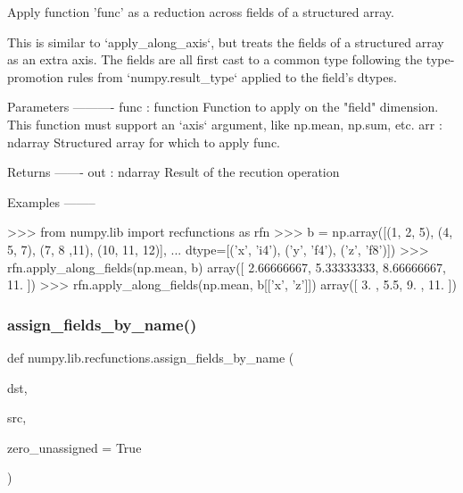 \begin{DoxyVerb}Apply function 'func' as a reduction across fields of a structured array.

This is similar to `apply_along_axis`, but treats the fields of a
structured array as an extra axis. The fields are all first cast to a
common type following the type-promotion rules from `numpy.result_type`
applied to the field's dtypes.

Parameters
----------
func : function
   Function to apply on the "field" dimension. This function must
   support an `axis` argument, like np.mean, np.sum, etc.
arr : ndarray
   Structured array for which to apply func.

Returns
-------
out : ndarray
   Result of the recution operation

Examples
--------

>>> from numpy.lib import recfunctions as rfn
>>> b = np.array([(1, 2, 5), (4, 5, 7), (7, 8 ,11), (10, 11, 12)],
...              dtype=[('x', 'i4'), ('y', 'f4'), ('z', 'f8')])
>>> rfn.apply_along_fields(np.mean, b)
array([ 2.66666667,  5.33333333,  8.66666667, 11.        ])
>>> rfn.apply_along_fields(np.mean, b[['x', 'z']])
array([ 3. ,  5.5,  9. , 11. ])\end{DoxyVerb}
 \mbox{\label{namespacenumpy_1_1lib_1_1recfunctions_aa1a4060efb8b5a93328a95d3b6771163}} 
\subsubsection{\texorpdfstring{assign\+\_\+fields\+\_\+by\+\_\+name()}{assign\_fields\_by\_name()}}
{\footnotesize\ttfamily def numpy.\+lib.\+recfunctions.\+assign\+\_\+fields\+\_\+by\+\_\+name (\begin{DoxyParamCaption}\item[{}]{dst,  }\item[{}]{src,  }\item[{}]{zero\+\_\+unassigned = {\ttfamily True} }\end{DoxyParamCaption})}

